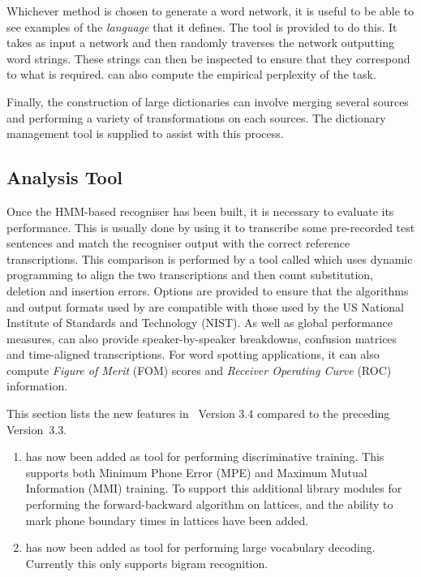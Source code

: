 Whichever method is chosen to generate a word network, it is useful
to be able to see examples of the \textit{language} that it defines.
The tool  is 
provided to do this.  It takes as input
a network and then randomly traverses the network outputting word
strings.  These strings can then be inspected to ensure that they
correspond to what is required.   can also compute
the empirical perplexity of the task.

Finally, the construction of large dictionaries can involve merging
several sources and performing a variety of transformations on each
sources.  The dictionary management 
tool  is supplied
to assist with this process.

\subsection{Analysis Tool}

Once the HMM-based recogniser has been built, it is necessary
to evaluate its performance.  This is usually done by using it
to transcribe some pre-recorded test sentences and match the
recogniser output with the correct reference transcriptions.
This comparison is performed by a tool called 
 which uses dynamic programming to align the two transcriptions
and then count substitution, deletion and insertion errors.
Options are provided to ensure that the
algorithms and output formats used 
by  are compatible
with those used by the US National Institute of Standards and Technology
(NIST).
As well as global performance measures,
 can also provide speaker-by-speaker breakdowns,
confusion matrices and time-aligned transcriptions.  For word spotting
applications, it can also compute \textit{Figure of Merit} (FOM) scores
and \textit{Receiver Operating Curve} (ROC) information.



This  section lists the new
features in \HTK\ Version 3.4 compared to the preceding Version~3.3.

\begin{enumerate}
\item {} has now been added as tool for performing
discriminative training. This supports both Minimum Phone Error (MPE)
and Maximum Mutual Information (MMI) training. To support this
additional library modules for performing the forward-backward
algorithm on lattices, and the ability to mark phone boundary
times in lattices have been added.

\item {} has now been added as tool for performing
large vocabulary decoding. Currently this only supports bigram 
recognition.
\end{enumerate}

